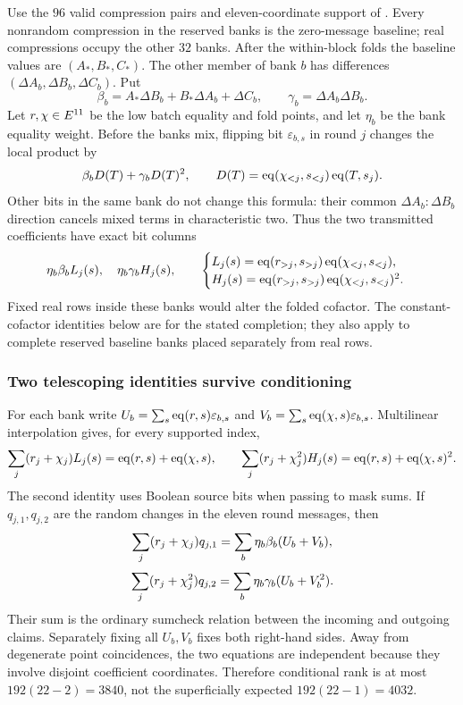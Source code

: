 Use the $96$ valid compression pairs and eleven-coordinate support of . Every nonrandom compression in the reserved banks is the zero-message baseline; real compressions occupy the other $32$ banks. After the within-block folds the baseline values are $(A_*,B_*,C_*)$. The other member of bank $b$ has differences $(\Delta A_b,\Delta B_b,\Delta C_b)$. Put
\[
 \beta_b=A_*\Delta B_b+B_*\Delta A_b+\Delta C_b,
 \qquad \gamma_b=\Delta A_b\Delta B_b.
\]
Let $r,\chi\in E^{11}$ be the low batch equality and fold points, and let $\eta_b$ be the bank equality weight. Before the banks mix, flipping bit $\varepsilon_{b,s}$ in round $j$ changes the local product by
\[
 \beta_b D(T)+\gamma_b D(T)^2,
 \qquad D(T)=\operatorname{eq}(\chi_{<j},s_{<j})\operatorname{eq}(T,s_j).
\]
Other bits in the same bank do not change this formula: their common $\Delta A_b:\Delta B_b$ direction cancels mixed terms in characteristic two. Thus the two transmitted coefficients have exact bit columns
\[
 \eta_b\beta_b L_j(s),\quad \eta_b\gamma_b H_j(s),
 \qquad
 \begin{cases}
 L_j(s)=\operatorname{eq}(r_{>j},s_{>j})\operatorname{eq}(\chi_{<j},s_{<j}),\\
 H_j(s)=\operatorname{eq}(r_{>j},s_{>j})\operatorname{eq}(\chi_{<j},s_{<j})^2.
 \end{cases}
\]
Fixed real rows inside these banks would alter the folded cofactor. The constant-cofactor identities below are for the stated completion; they also apply to complete reserved baseline banks placed separately from real rows.

\subsubsection{Two telescoping identities survive conditioning}

For each bank write $U_b=\sum_s\operatorname{eq}(r,s)\varepsilon_{b,s}$ and $V_b=\sum_s\operatorname{eq}(\chi,s)\varepsilon_{b,s}$. Multilinear interpolation gives, for every supported index,
\[
 \sum_j(r_j+\chi_j)L_j(s)=\operatorname{eq}(r,s)+\operatorname{eq}(\chi,s),
 \qquad
 \sum_j(r_j+\chi_j^2)H_j(s)=\operatorname{eq}(r,s)+\operatorname{eq}(\chi,s)^2.
\]
The second identity uses Boolean source bits when passing to mask sums. If $q_{j,1},q_{j,2}$ are the random changes in the eleven round messages, then
\[
 \sum_j(r_j+\chi_j)q_{j,1}=\sum_b\eta_b\beta_b(U_b+V_b),
\]
\[
 \sum_j(r_j+\chi_j^2)q_{j,2}=\sum_b\eta_b\gamma_b(U_b+V_b^2).
\]
Their sum is the ordinary sumcheck relation between the incoming and outgoing claims. Separately fixing all $U_b,V_b$ fixes both right-hand sides. Away from degenerate point coincidences, the two equations are independent because they involve disjoint coefficient coordinates. Therefore conditional rank is at most $192(22-2)=3840$, not the superficially expected $192(22-1)=4032$.


